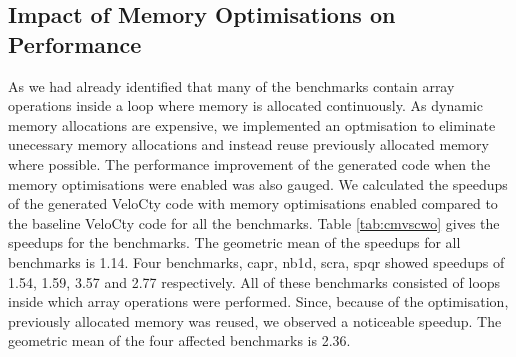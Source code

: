 \subsection{Impact of Memory Optimisations on Performance}
As we had already identified that many of the benchmarks contain array operations inside a loop where memory is allocated continuously. As dynamic memory allocations are expensive, we implemented an optmisation to eliminate unecessary memory allocations and instead reuse previously allocated memory where possible. The performance improvement of the generated code when the memory optimisations were enabled was also gauged. We calculated the speedups of the generated VeloCty code with memory optimisations enabled compared to the baseline VeloCty code for all the benchmarks. Table \ref{tab:cmvscwo} gives the speedups for the benchmarks. The geometric mean of the speedups for all benchmarks is 1.14. Four benchmarks, \textsf{capr}, \textsf{nb1d}, \textsf{scra}, \textsf{spqr} showed speedups of 1.54, 1.59,  3.57 and 2.77 respectively. All of these benchmarks consisted of loops inside which array operations were performed. Since, because of the optimisation, previously allocated memory was reused, we observed a noticeable speedup. The geometric mean of the four affected benchmarks is 2.36. 
